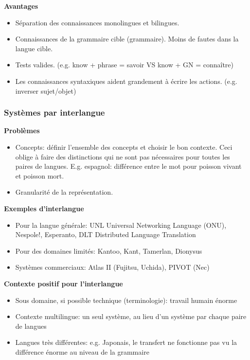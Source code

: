 \textbf{Avantages}

\begin{itemize}
    \item Séparation des connaissances monolingues et bilingues.
    \item Connaissances de la grammaire cible (grammaire). Moins de fautes dans la langue cible.
    \item Tests valides. (e.g. know + phrase = savoir VS know + GN = connaître)
    \item Les connaissances syntaxiques aident grandement à écrire les actions. (e.g. inverser sujet/objet)
\end{itemize}

\subsubsection{Systèmes par interlangue}

\textbf{Problèmes}

\begin{itemize}
    \item Concepts: définir l'ensemble des concepts et choisir le bon contexte. Ceci oblige à faire des distinctions qui ne sont pas nécessaires pour toutes les paires de langues. E.g. espagnol: différence entre le mot pour poisson vivant et poisson mort.
    \item Granularité de la représentation.\\
\end{itemize}


\textbf{Exemples d'interlangue}

\begin{itemize}
    \item Pour la langue générale: UNL Universal Networking Language (ONU), Nespole!, Esperanto, DLT Distributed Language Translation
    \item Pour des domaines limités: Kantoo, Kant, Tamerlan, Dionysus
    \item Systèmes commerciaux: Atlas II (Fujitsu, Uchida), PIVOT (Nec)\\
\end{itemize}

\textbf{Contexte positif pour l'interlangue}

\begin{itemize}
    \item Sous domaine, si possible technique (terminologie): travail humain énorme
    \item Contexte multilingue: un seul système, au lieu d'un système par chaque paire de langues
    \item Langues très différentes: e.g. Japonais, le transfert ne fonctionne pas vu la différence énorme au niveau de la grammaire
\end{itemize}
